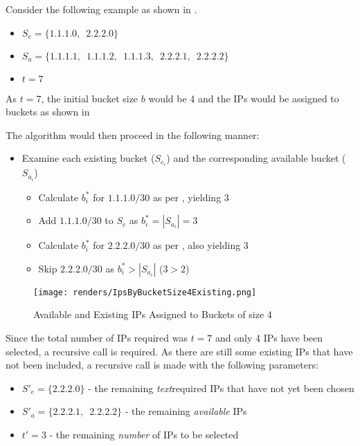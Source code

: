Consider the following example as shown in .
\begin{itemize}
\item{$S_e = \{1.1.1.0,\enspace2.2.2.0\}$}
\item{$S_a = \{1.1.1.1,\enspace1.1.1.2,\enspace1.1.1.3,\enspace2.2.2.1,\enspace2.2.2.2\}$}
\item{$t = 7$}
\end{itemize}

As $t = 7$, the initial bucket size $b$ would be 4 and the IPs would be assigned to buckets as shown in 

The algorithm would then proceed in the following manner:
\begin{itemize}
\item{Examine each existing bucket ($S_{e_i}$) and the corresponding available bucket ($S_{a_i}$)}
\begin{itemize}
\item{Calculate $b_i^*$ for $1.1.1.0/30$ as per , yielding 3}
\item{Add $1.1.1.0/30$ to $S_c$ as $b^*_i = |S_{a_i}| = 3$}
\end{itemize}
\begin{itemize}
\item{Calculate $b_i^*$ for $2.2.2.0/30$ as per , also yielding 3}
\item{Skip $2.2.2.0/30$ as $b^*_i > |S_{a_i}|$ ($3 > 2$)}    
\end{itemize}
\end{itemize}

\begin{figure}[H]
      \centering
      \texttt{[image: renders/IpsByBucketSize4Existing.png]}
      \caption{Available and Existing IPs Assigned to Buckets of size 4}
      \label{fig:ipsByBucketExisting4}
\end{figure}

Since the total number of IPs required was $t = 7$ and only 4 IPs have been selected, a recursive call is required. As there are still some existing IPs that have not been included, a recursive call is made with the following parameters:
\begin{itemize}
\item{$S'_e = \{2.2.2.0\}$ - the remaining \textit{text}{required} IPs that have not yet been chosen}
\item{$S'_a = \{2.2.2.1,\enspace2.2.2.2\}$ - the remaining \textit{available} IPs}
\item{$t' = 3$ - the remaining \textit{number} of IPs to be selected}
\end{itemize}

